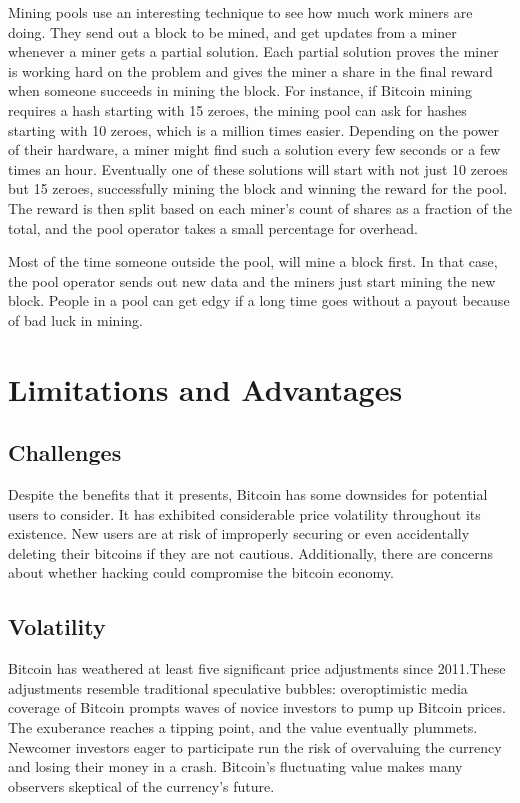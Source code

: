 Mining pools use an interesting technique to see how much work miners are doing. They send out a block to be mined, and get updates from a miner whenever a miner gets a partial solution. Each partial solution proves the miner is working hard on the problem and gives the miner a share in the final reward when someone succeeds in mining the block.
For instance, if Bitcoin mining requires a hash starting with 15 zeroes, the mining pool can ask for hashes starting with 10 zeroes, which is a million times easier. Depending on the power of their hardware, a miner might find such a solution every few seconds or a few times an hour. Eventually one of these solutions will start with not just 10 zeroes but 15 zeroes, successfully mining the block and winning the reward for the pool. The reward is then split based on each miner's count of shares as a fraction of the total, and the pool operator takes a small percentage for overhead.

Most of the time someone outside the pool, will mine a block first. In that case, the pool operator sends out new data and the miners just start mining the new block. People in a pool can get edgy if a long time goes without a payout because of bad luck in mining.


\chapter{Limitations and Advantages}

\section{Challenges}
Despite the benefits that it presents, Bitcoin has some downsides
for potential users to consider. It has exhibited considerable
price volatility throughout its existence. New users are at risk of
improperly securing or even accidentally deleting their bitcoins
if they are not cautious. Additionally, there are concerns about
whether hacking could compromise the bitcoin economy.

\section{Volatility}
Bitcoin has weathered at least five significant price adjustments
since 2011.These adjustments resemble traditional speculative
bubbles: overoptimistic media coverage of Bitcoin prompts waves
of novice investors to pump up Bitcoin prices. The exuberance
reaches a tipping point, and the value eventually plummets.
Newcomer investors eager to participate run the risk of overvaluing
the currency and losing their money in a crash. Bitcoin’s fluctuating
value makes many observers skeptical of the currency’s
future.


